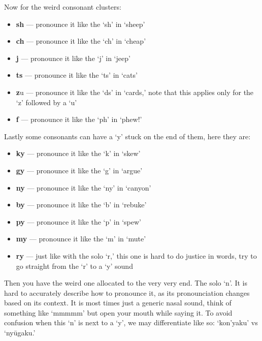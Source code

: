 Now for the weird consonant clusters:

\begin{itemize}

	\item \textbf{sh} --- pronounce it like the `sh' in `sheep'

	\item \textbf{ch} --- pronounce it like the `ch' in `cheap'

	\item \textbf{j} --- pronounce it like the `j' in `jeep'

	\item \textbf{ts} --- pronounce it like the `ts' in `cats'

	\item \textbf{z}u --- pronounce it like the `ds' in `cards,' note that this applies only for the `z' followed by a `u'

	\item \textbf{f} --- pronounce it like the `ph' in `phew!'

\end{itemize}

Lastly some consonants can have a `y' stuck on the end of them, here they are:

\begin{itemize}

	\item \textbf{ky} --- pronounce it like the `k' in `skew'

	\item \textbf{gy} --- pronounce it like the `g' in `argue'

	\item \textbf{ny} --- pronounce it like the `ny' in `canyon'

	\item \textbf{by} --- pronounce it like the `b' in `rebuke'

	\item \textbf{py} --- pronounce it like the `p' in `spew'

	\item \textbf{my} --- pronounce it like the `m' in `mute'

	\item \textbf{ry} --- just like with the solo `r,' this one is hard to do justice in words, try to go straight from the `r' to a `y' sound

\end{itemize}

Then you have the weird one allocated to the very very end. The solo `n'. It is hard to accurately describe how to pronounce it, as its pronounciation changes based on its context. It is most times just a generic nasal sound, think of something like `mmmmm' but open your mouth while saying it. To avoid confusion when this `n' is next to a `y', we may differentiate like so: `kon'yaku' vs `ny\=ugaku.'
